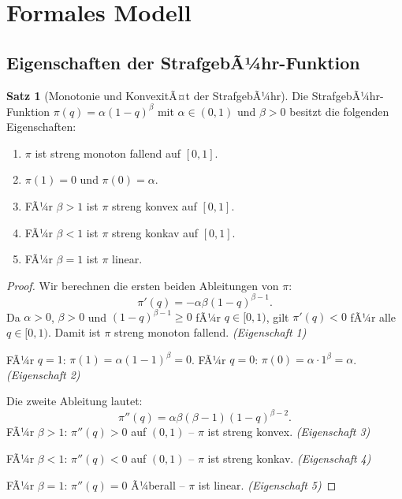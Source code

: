 ﻿\documentclass[a4paper,12pt]{article}
\theoremstyle{definition}
\newtheorem{satz}{Satz}
\begin{document}
\section{Formales Modell}
\label{sec:modell}

\subsection{Eigenschaften der StrafgebÃ¼hr-Funktion}

\begin{satz}[Monotonie und KonvexitÃ¤t der StrafgebÃ¼hr]
\label{satz:mono}
Die StrafgebÃ¼hr-Funktion $\pi(q) = \alpha(1-q)^{\beta}$ mit $\alpha \in (0,1)$
und $\beta > 0$ besitzt die folgenden Eigenschaften:
\begin{enumerate}
  \item $\pi$ ist streng monoton fallend auf $[0,1]$.
  \item $\pi(1) = 0$ und $\pi(0) = \alpha$.
  \item FÃ¼r $\beta > 1$ ist $\pi$ streng konvex auf $[0,1]$.
  \item FÃ¼r $\beta < 1$ ist $\pi$ streng konkav auf $[0,1]$.
  \item FÃ¼r $\beta = 1$ ist $\pi$ linear.
\end{enumerate}
\end{satz}

\begin{proof}
Wir berechnen die ersten beiden Ableitungen von $\pi$:
\[
\pi'(q) = -\alpha \beta (1-q)^{\beta-1}.
\]
Da $\alpha > 0$, $\beta > 0$ und $(1-q)^{\beta-1} \geq 0$ fÃ¼r $q \in [0,1)$,
gilt $\pi'(q) < 0$ fÃ¼r alle $q \in [0,1)$.  Damit ist $\pi$ streng monoton fallend.
\emph{(Eigenschaft 1)}

FÃ¼r $q = 1$: $\pi(1) = \alpha(1-1)^{\beta} = 0$.
FÃ¼r $q = 0$: $\pi(0) = \alpha \cdot 1^{\beta} = \alpha$.
\emph{(Eigenschaft 2)}

Die zweite Ableitung lautet:
\[
\pi''(q) = \alpha \beta (\beta - 1)(1-q)^{\beta-2}.
\]
FÃ¼r $\beta > 1$: $\pi''(q) > 0$ auf $(0,1)$ -- $\pi$ ist streng konvex.
\emph{(Eigenschaft 3)}

FÃ¼r $\beta < 1$: $\pi''(q) < 0$ auf $(0,1)$ -- $\pi$ ist streng konkav.
\emph{(Eigenschaft 4)}

FÃ¼r $\beta = 1$: $\pi''(q) = 0$ Ã¼berall -- $\pi$ ist linear.
\emph{(Eigenschaft 5)}
\end{proof}
\end{document}
